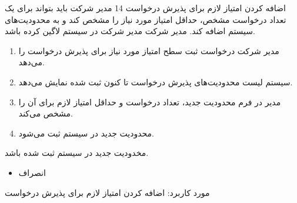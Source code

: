 
{
	\usecase
	{اضافه کردن امتیاز لازم برای پذیرش درخواست}
	{14}
	{مدیر شرکت باید بتواند برای یک تعداد درخواست مشخص، حداقل امتیاز مورد نیاز را مشخص کند و به محدودیت‌های سیستم اضافه کند.}
	{مدیر شرکت}
	{}
	{مدیر شرکت در سیستم لاگین کرده باشد.}
	{
		\vspace*{-0.6cm}
		\begin{enumerate}
			\item مدیر شرکت درخواست ثبت سطح امتیاز مورد نیاز برای پذیرش درخواست را می‌دهد.
			\item سیستم لیست محدودیت‌های پذیرش درخواست تا کنون ثبت شده نمایش می‌دهد.
 \item
مدیر در فرم محدودیت جدید، تعداد درخواست و حداقل امتیاز لازم برای آن را مشخص می‌کند.
			\item 
محدودیت جدید در سیستم ثبت می‌شود.
		\end{enumerate}
	}
	{مخدودیت جدید در سیستم ثبت شده باشد.}
	{
		\begin{itemize}
			\item
			انصراف
		\end{itemize}
	}
	{
		مورد کاربرد: اضافه کردن امتیاز لازم برای پذیرش درخواست
	}
}

	
	
	
	
	

